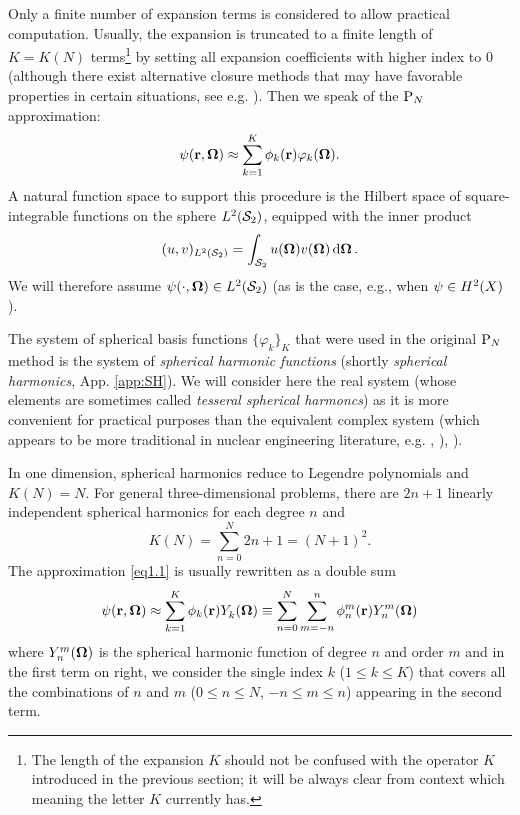 Only a finite number of expansion terms is considered to allow practical computation.
Usually, the expansion is truncated to a finite length of $K = K(N)$ terms\footnote{The length of the expansion $K$
should not be confused with the operator $K$ introduced in the previous section; it will be always clear from context 
which meaning the letter $K$ currently has.} by setting all expansion coefficients with higher index to 0 (although there exist alternative closure methods that may have favorable properties in certain situations, see e.g.
\cite{Frank0}). Then we speak of the $\PN$ approximation:
\begin{equation}\label{eq1.1}
  \psi(\br,\bomega) \approx \sum_{k=1}^{ K} \phi_k(\br) \varphi_k(\bomega).
\end{equation}
A natural function space to support this procedure is the Hilbert space of
square-integrable functions on the sphere $\Lp[2](\Sphere)$, equipped with the inner product
\begin{equation}\label{eq:s2_ip}
	(u, v)_{\Lp[2](\Sphere)} = \intA{u(\bomega) {v(\bomega)}}.
\end{equation}
We will therefore assume \mbox{$\psi(\cdot,\bomega)\in\Lp[2](\Sphere)$} (as is the case, e.g., when 
$\psi\in\Hp[2](X)$).

The system of spherical basis functions $\{\varphi_k\}_K$ that were used in the original $\PN$ method is the
system of \textit{spherical harmonic functions} (shortly \textit{spherical harmonics}, App. \ref{app:SH}).
We will consider here the real system (whose elements are sometimes called \textit{tesseral spherical harmoncs}) as it is more convenient
for practical purposes than the equivalent complex system (which appears to be more traditional in nuclear engineering 
literature, e.g. \cite[Sec. 9.7]{Stacey1}, \cite[Sec. 14.4]{Reuss1}), \cite[Chap. V]{Stammler}). 

In one dimension, spherical harmonics reduce to 
Legendre polynomials and $ K(N) = N$.
For general three-dimensional problems, there are $2n + 1$ linearly independent spherical harmonics for each degree $n$ 
and 
$$ 
	K(N) = \sum_{n=0}^{N} 2n + 1 = (N+1)^2.
$$
%
The approximation \eqref{eq1.1} is usually rewritten as a double sum
\begin{equation}\label{eq:pn_approx}
	\psi(\br,\bomega) \approx \sum_{k=1}^{ K} \phi_k(\br)\Y{k}{}(\bomega) \equiv
	\suma[n]{0}{N}\suma[m]{-n}{n}\angmom{n}{m}(\br)\Y{n}{m}(\bomega)
\end{equation}
where $\Y{n}{m}(\bomega)$ is the spherical harmonic function of degree $n$ and order $m$
and in the first term on right, we consider the single index $k$ ($1 \leq k \leq  K$) that covers all the combinations
of $n$ and $m$ ($0 \leq n \leq N$, $-n\leq m \leq n$) appearing in the second term.

